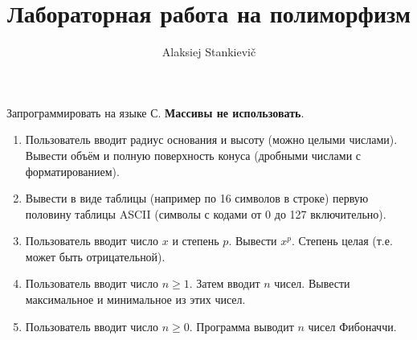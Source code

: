 \documentclass[12pt]{article}
\author{Alaksiej Stankievič}
\title{Лабораторная работа на полиморфизм}
\begin{document}
 Запрограммировать на языке С. \textbf{Массивы не использовать}.
 \begin{enumerate}
  \item Пользователь вводит радиус основания и высоту (можно целыми числами). Вывести объём и полную поверхность конуса (дробными числами с форматированием).
  \item Вывести в виде таблицы (например по 16 символов в строке) первую половину таблицы ASCII (символы с кодами от 0 до 127 включительно).
  \item Пользователь вводит число $x$ и степень $p$. Вывести $x^p$. Степень целая (т.е. может быть отрицательной).
  \item Пользователь вводит число $n\geq1$. Затем вводит $n$ чисел. Вывести максимальное и минимальное из этих чисел.
  \item Пользователь вводит число $n\geq0$. Программа выводит $n$ чисел Фибоначчи. 
 \end{enumerate}
\end{document}
